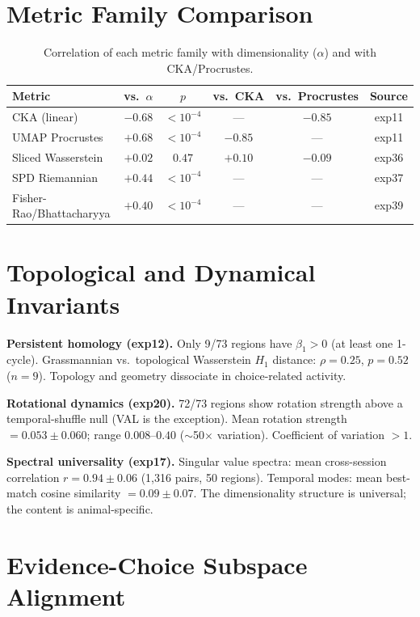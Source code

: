 \documentclass{article}
\begin{document}
\section{Metric Family Comparison}
\label{app:metrics}

\begin{table}[h]
\centering
\small
\caption{Correlation of each metric family with dimensionality ($\alpha$) and with CKA/Procrustes.}
\label{tab:metrics}
\begin{tabular}{@{}lccccc@{}}
\toprule
\textbf{Metric} & \textbf{vs.\ $\alpha$} & \textbf{$p$} & \textbf{vs.\ CKA} & \textbf{vs.\ Procrustes} & \textbf{Source} \\
\midrule
CKA (linear) & $-0.68$ & $< 10^{-4}$ & --- & $-0.85$ & exp11 \\
UMAP Procrustes & $+0.68$ & $< 10^{-4}$ & $-0.85$ & --- & exp11 \\
Sliced Wasserstein & $+0.02$ & $0.47$ & $+0.10$ & $-0.09$ & exp36 \\
SPD Riemannian & $+0.44$ & $< 10^{-4}$ & --- & --- & exp37 \\
Fisher-Rao/Bhattacharyya & $+0.40$ & $< 10^{-4}$ & --- & --- & exp39 \\
\bottomrule
\end{tabular}
\end{table}

\section{Topological and Dynamical Invariants}
\label{app:topo_dyn}

\textbf{Persistent homology (exp12).} Only 9/73 regions have $\beta_1 > 0$ (at least one 1-cycle). Grassmannian vs.\ topological Wasserstein $H_1$ distance: $\rho = 0.25$, $p = 0.52$ ($n = 9$). Topology and geometry dissociate in choice-related activity.

\textbf{Rotational dynamics (exp20).} 72/73 regions show rotation strength above a temporal-shuffle null (VAL is the exception). Mean rotation strength $= 0.053 \pm 0.060$; range $0.008$--$0.40$ ($\sim$50$\times$ variation). Coefficient of variation $> 1$.

\textbf{Spectral universality (exp17).} Singular value spectra: mean cross-session correlation $r = 0.94 \pm 0.06$ (1,316 pairs, 50 regions). Temporal modes: mean best-match cosine similarity $= 0.09 \pm 0.07$. The dimensionality structure is universal; the content is animal-specific.

\section{Evidence-Choice Subspace Alignment}
\label{app:alignment}
\end{document}
